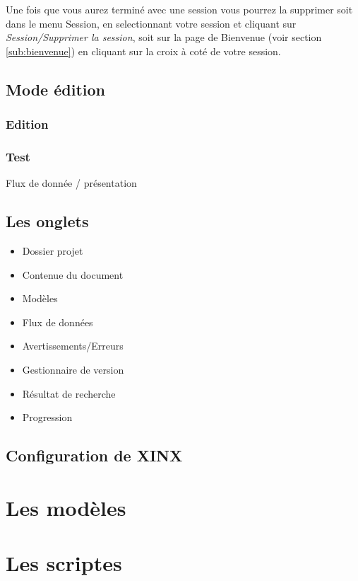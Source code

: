 \documentclass[a4paper,10pt,twoside]{book}
\begin{document}
Une fois que vous aurez terminé avec une session vous pourrez la supprimer soit dans le menu Session, en selectionnant votre session et cliquant sur \emph{Session/Supprimer la session}, soit sur la page de Bienvenue (voir section \ref{sub:bienvenue}) en cliquant sur la croix à coté de votre session.

\section{Mode édition}

\subsection{Edition}

\subsection{Test}

Flux de donnée / présentation

\section{Les onglets}
\label{sec:dock}

\begin{itemize}
  \item Dossier projet
  \item Contenue du document
  \item Modèles
  \item Flux de données
  \item Avertissements/Erreurs
  \item Gestionnaire de version
  \item Résultat de recherche
  \item Progression
\end{itemize}

\section{Configuration de XINX}

\chapter{Les modèles}

\chapter{Les scriptes}
\label{sec:Scripts}
\end{document}
